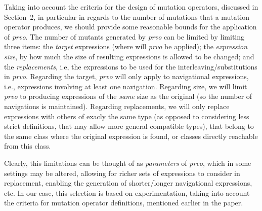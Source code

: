 Taking into account the criteria for the design of mutation operators, discussed in Section~2, in particular in regards to the number of mutations that a mutation operator produces, we should provide some reasonable bounds for the application of \emph{prvo}. The number of mutants generated by \emph{prvo} can be limited by limiting three items: the \emph{target} expressions (where will \emph{prvo} be applied); the \emph{expression size}, by how much the size of resulting expressions is allowed to be changed; and the \emph{replacements}, i.e, the expressions to be used for the interleaving/substitutions in \emph{prvo}. Regarding the target, \emph{prvo} will only apply to navigational expressions, i.e., expressions involving at least one navigation. Regarding size, we will limit \emph{prvo} to producing expressions of the \emph{same} size as the original (so the number of navigations is maintained). Regarding replacements, we will only replace expressions with others of exacly the same type (as opposed to considering less strict definitions, that may allow more general compatible types), that belong to the same class where the original expression is found, or classes directly reachable from this class. 

Clearly, this limitations can be thought of as \emph{parameters} of \emph{prvo}, which in some settings may be altered, allowing for richer sets of expressions to consider in replacement, enabling the generation of shorter/longer navigational expressions, etc. In our case, this selection is based on experimentation, taking into account the criteria for mutation operator definitions, mentioned earlier in the paper.